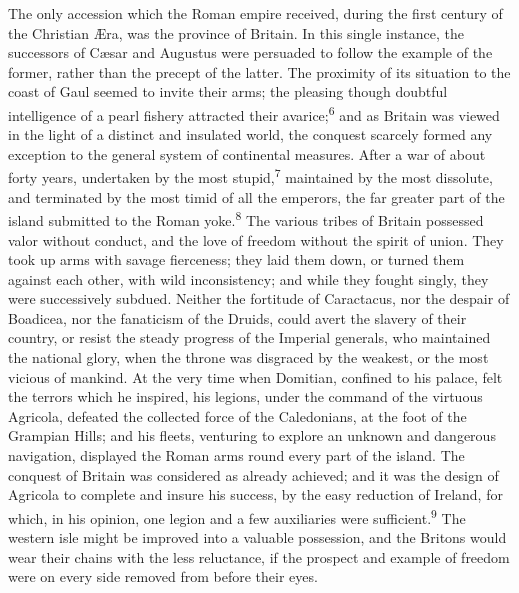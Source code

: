 The only accession which the Roman empire received, during the
first century of the Christian Æra, was the province of Britain.
In this single instance, the successors of Cæsar and Augustus
were persuaded to follow the example of the former, rather than
the precept of the latter. The proximity of its situation to the
coast of Gaul seemed to invite their arms; the pleasing though
doubtful intelligence of a pearl fishery attracted their avarice;\textsuperscript{6}
and as Britain was viewed in the light of a distinct and
insulated world, the conquest scarcely formed any exception to
the general system of continental measures. After a war of about
forty years, undertaken by the most stupid,\textsuperscript{7} maintained by the
most dissolute, and terminated by the most timid of all the
emperors, the far greater part of the island submitted to the
Roman yoke.\textsuperscript{8} The various tribes of Britain possessed valor
without conduct, and the love of freedom without the spirit of
union. They took up arms with savage fierceness; they laid them
down, or turned them against each other, with wild inconsistency;
and while they fought singly, they were successively subdued.
Neither the fortitude of Caractacus, nor the despair of Boadicea,
nor the fanaticism of the Druids, could avert the slavery of
their country, or resist the steady progress of the Imperial
generals, who maintained the national glory, when the throne was
disgraced by the weakest, or the most vicious of mankind. At the
very time when Domitian, confined to his palace, felt the terrors
which he inspired, his legions, under the command of the virtuous
Agricola, defeated the collected force of the Caledonians, at the
foot of the Grampian Hills; and his fleets, venturing to explore
an unknown and dangerous navigation, displayed the Roman arms
round every part of the island. The conquest of Britain was
considered as already achieved; and it was the design of Agricola
to complete and insure his success, by the easy reduction of
Ireland, for which, in his opinion, one legion and a few
auxiliaries were sufficient.\textsuperscript{9} The western isle might be improved
into a valuable possession, and the Britons would wear their
chains with the less reluctance, if the prospect and example of
freedom were on every side removed from before their eyes.


